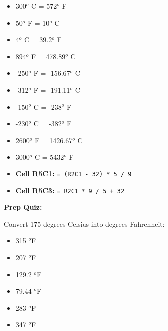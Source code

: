 





\begin{itemize}
\item{} 300$^{o}$ C = 572$^{o}$ F 
\vskip 5pt
\item{} 50$^{o}$ F = 10$^{o}$ C 
\vskip 5pt
\item{} 4$^{o}$ C = 39.2$^{o}$ F 
\vskip 5pt
\item{} 894$^{o}$ F = 478.89$^{o}$ C 
\vskip 5pt
\item{} -250$^{o}$ F = -156.67$^{o}$ C 
\vskip 5pt
\item{} -312$^{o}$ F = -191.11$^{o}$ C 
\vskip 5pt
\item{} -150$^{o}$ C = -238$^{o}$ F 
\vskip 5pt
\item{} -230$^{o}$ C = -382$^{o}$ F 
\vskip 5pt
\item{} 2600$^{o}$ F = 1426.67$^{o}$ C 
\vskip 5pt
\item{} 3000$^{o}$ C = 5432$^{o}$ F 
\end{itemize}








\begin{itemize}
\item{} {\bf Cell R5C1:} {\tt = (R2C1 - 32) * 5 / 9}
\item{} {\bf Cell R5C3:} {\tt = R2C1 * 9 / 5 + 32}
\end{itemize}


\vfil \eject

\noindent
{\bf Prep Quiz:}

Convert 175 degrees Celsius into degrees Fahrenheit:

\begin{itemize}
\item{} 315 $^{o}$F 
\vskip 5pt 
\item{} 207 $^{o}$F 
\vskip 5pt 
\item{} 129.2 $^{o}$F 
\vskip 5pt 
\item{} 79.44 $^{o}$F 
\vskip 5pt 
\item{} 283 $^{o}$F
\vskip 5pt 
\item{} 347 $^{o}$F
\end{itemize}





